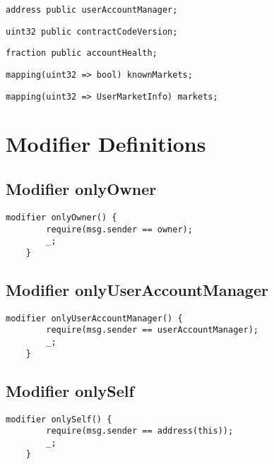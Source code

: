 \begin{lstlisting}[firstnumber=26]
    address public userAccountManager;
\end{lstlisting}

\begin{lstlisting}[firstnumber=29]
    uint32 public contractCodeVersion;
\end{lstlisting}

\begin{lstlisting}[firstnumber=31]
    fraction public accountHealth;
\end{lstlisting}

\begin{lstlisting}[firstnumber=33]
    mapping(uint32 => bool) knownMarkets;
\end{lstlisting}

\begin{lstlisting}[firstnumber=34]
    mapping(uint32 => UserMarketInfo) markets;
\end{lstlisting}

\section{Modifier Definitions}


\subsection{Modifier onlyOwner}


\begin{lstlisting}[firstnumber=412]
    modifier onlyOwner() {
        require(msg.sender == owner);
        _;
    }
\end{lstlisting}

\subsection{Modifier onlyUserAccountManager}


\begin{lstlisting}[firstnumber=417]
    modifier onlyUserAccountManager() {
        require(msg.sender == userAccountManager);
        _;
    }
\end{lstlisting}

\subsection{Modifier onlySelf}


\begin{lstlisting}[firstnumber=422]
    modifier onlySelf() {
        require(msg.sender == address(this));
        _;
    }
\end{lstlisting}

